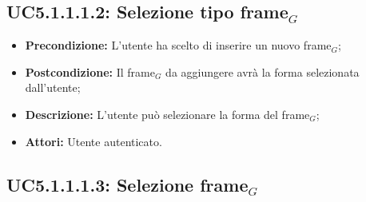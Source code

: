 \subsection{ UC5.1.1.1.2: Selezione tipo frame$_G$ }

\begin{itemize}
	\item \textbf{Precondizione:} L'utente ha scelto di inserire un nuovo frame$_G$;
	\item \textbf{Postcondizione:} Il frame$_G$ da aggiungere avrà la forma selezionata dall'utente;
	\item \textbf{Descrizione:} L'utente può selezionare la forma del frame$_G$;
	\item \textbf{Attori:} Utente autenticato.
\end{itemize}
\subsection{ UC5.1.1.1.3: Selezione frame$_G$}

